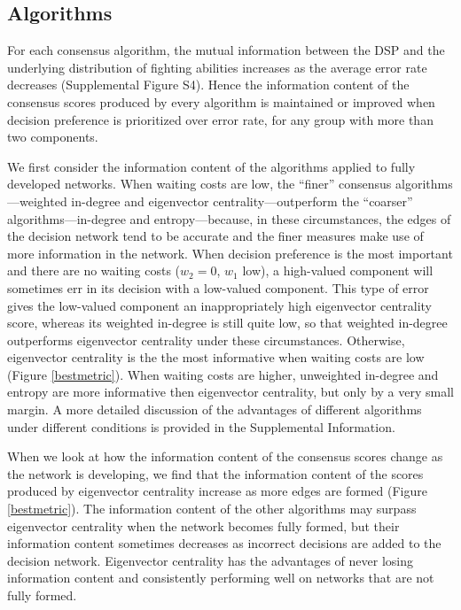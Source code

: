 \documentclass{pnastwo}
\begin{document}
\begin{article}
\subsection{Algorithms}
For each consensus algorithm, the mutual information between the DSP and the underlying distribution of fighting abilities increases as the average error rate decreases (Supplemental Figure S4). Hence the information content of the consensus scores produced by every algorithm is maintained or improved when decision preference is prioritized over error rate, for any group with more than two components. 

We first consider the information content of the algorithms applied to fully developed networks. When waiting costs are low, the ``finer'' consensus algorithms---weighted in-degree and eigenvector centrality---outperform the ``coarser'' algorithms---in-degree and entropy---because, in these circumstances, the edges of the decision network tend to be accurate and the finer measures make use of more information in the network. When decision preference is the most important and there are no waiting costs ($w_2=0$, $w_1$ low), a high-valued component will sometimes err in its decision with a low-valued component. This  type of error gives the low-valued component an inappropriately high eigenvector centrality score, whereas its weighted in-degree is still quite low, so that weighted in-degree outperforms eigenvector centrality under these circumstances. Otherwise, eigenvector centrality is the the most informative when waiting costs are low (Figure \ref{bestmetric}). When waiting costs are higher, unweighted in-degree and entropy are more informative then eigenvector centrality, but only by a very small margin. A more detailed discussion of the advantages of different algorithms under different conditions is provided in the Supplemental Information.

When we look at how the information content of the consensus scores change as the network is developing, we find that the information content of the scores produced by eigenvector centrality increase as more edges are formed (Figure \ref{bestmetric}). The information content of the other algorithms may surpass eigenvector centrality when the network becomes fully formed, but their information content sometimes decreases as incorrect decisions are added to the decision network. Eigenvector centrality has the advantages of never losing information content and consistently performing well on networks that are not fully formed.




\end{article}
\end{document}
